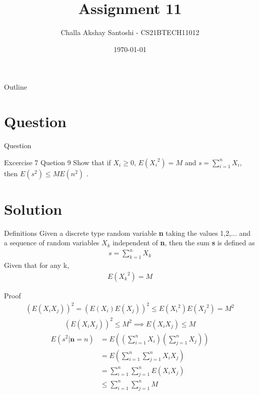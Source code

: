 \documentclass{beamer}
\title{Assignment 11}
\author{Challa Akshay Santoshi - CS21BTECH11012}
\date{\today}
\begin{document}
\begin{frame}
    \titlepage 
\end{frame}

\logo{}


\begin{frame}{Outline}
    \tableofcontents
\end{frame}


\section{Question}
\begin{frame}{Question}
\begin{block}{Excercise 7 Quetion 9} Show that if $X_i \geq 0$, $E({X_i}^2) = M$ and $s = \sum_{i=1}^{n}X_i $, then $E(s^2) \leq ME(n^2)$ .
    \end{block}
\end{frame}

\section{Solution}
\begin{frame}{Definitions}
Given a discrete type random variable \textbf{n} taking the values 1,2,... and a sequence of random variables \textbf{$X_k$} independent of \textbf{n}, then the sum \textbf{s} is defined as 
\begin{align}
    s = \sum_{k=1}^{n} X_k
\end{align}
Given that for any k,
\begin{align}
    E({X_k}^2) = M
\end{align}
\end{frame}

\begin{frame}{Proof}
\begin{align}
    (E(X_iX_j))^2 = (E(X_i)E(X_j))^2 \leq E({X_i}^2)E({X_j}^2) = M^2
    \end{align}
    \begin{align}
    (E(X_iX_j))^2 \leq M^2
    \implies E(X_iX_j) \leq M
\end{align}
\begin{align}
    E(s^2|\textbf{n} = n) &= E((\sum_{i=1}^{n}X_i)(\sum_{j=1}^{n}X_j))\\
    &= E(\sum_{i=1}^{n}\sum_{j=1}^{n}X_iX_j)\\
    &= \sum_{i=1}^{n}\sum_{j=1}^{n} E(X_iX_j)\\
    &\leq \sum_{i=1}^{n}\sum_{j=1}^{n} M
\end{align}
\end{frame}
\end{document}
